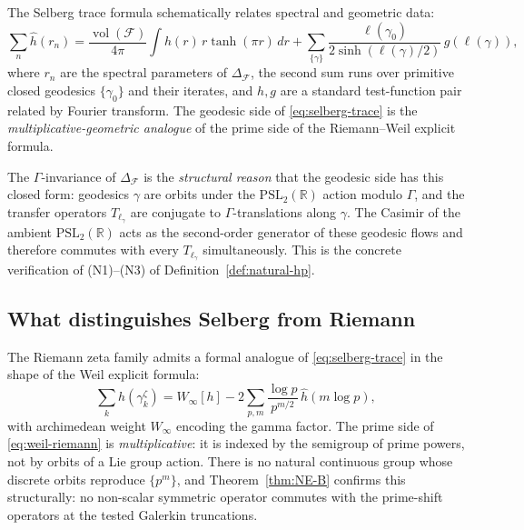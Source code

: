 \documentclass[11pt]{article}
\theoremstyle{definition}
\theoremstyle{remark}
\newcommand{\PSL}{\mathrm{PSL}}
\begin{document}
The Selberg trace formula \cite{Selberg1956} schematically relates
spectral and geometric data:
\begin{equation}
\label{eq:selberg-trace}
  \sum_n \widehat{h}(r_n)
  = \frac{\operatorname{vol}(\mathcal{F})}{4\pi} \int h(r)\,r\tanh(\pi r)\,dr
  + \sum_{\{\gamma\}} \frac{\ell(\gamma_0)}{2\sinh(\ell(\gamma)/2)}\,
      g(\ell(\gamma)),
\end{equation}
where $r_n$ are the spectral parameters of $\Delta_\mathcal{F}$, the
second sum runs over primitive closed geodesics $\{\gamma_0\}$ and
their iterates, and $h, g$ are a standard test-function pair related
by Fourier transform. The geodesic side of \eqref{eq:selberg-trace}
is the \emph{multiplicative-geometric analogue} of the prime side of
the Riemann--Weil explicit formula.

The $\Gamma$-invariance of $\Delta_\mathcal{F}$ is the
\emph{structural reason} that the geodesic side has this closed
form: geodesics $\gamma$ are orbits under the $\PSL_2(\mathbb{R})$
action modulo $\Gamma$, and the transfer operators $T_{\ell_\gamma}$
are conjugate to $\Gamma$-translations along $\gamma$. The Casimir
of the ambient $\PSL_2(\mathbb{R})$ acts as the second-order
generator of these geodesic flows and therefore commutes with every
$T_{\ell_\gamma}$ simultaneously. This is the concrete verification
of (N1)--(N3) of Definition~\ref{def:natural-hp}.

\subsection{What distinguishes Selberg from Riemann}
\label{sec:selberg-vs-riemann}

The Riemann zeta family admits a formal analogue of
\eqref{eq:selberg-trace} in the shape of the Weil explicit formula:
\begin{equation}
\label{eq:weil-riemann}
  \sum_k h(\gamma_k^\zeta)
  = W_\infty[h]
  - 2\sum_{p,m} \frac{\log p}{p^{m/2}}\,\widehat{h}(m\log p),
\end{equation}
with archimedean weight $W_\infty$ encoding the gamma factor. The
prime side of \eqref{eq:weil-riemann} is \emph{multiplicative}: it is
indexed by the semigroup of prime powers, not by orbits of a Lie
group action. There is no natural continuous group whose discrete
orbits reproduce $\{p^m\}$, and Theorem~\ref{thm:NE-B} confirms
this structurally: no non-scalar symmetric operator commutes with
the prime-shift operators at the tested Galerkin truncations.
\end{document}
